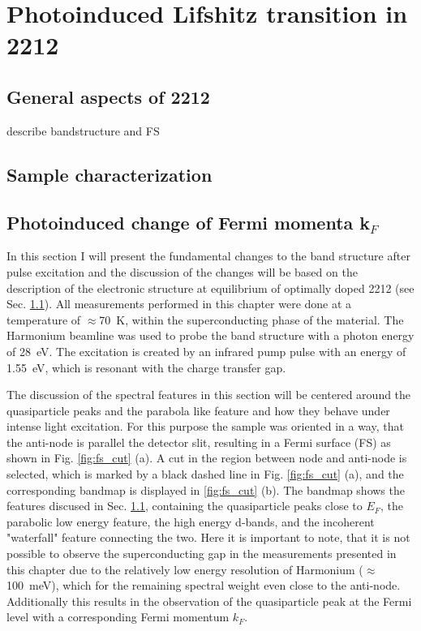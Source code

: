 \chapter{Photoinduced Lifshitz transition in 2212}



\section{General aspects of 2212}
\label{sec:bscco_general}


describe bandstructure and FS

\section{Sample characterization}



\section{Photoinduced change of Fermi momenta k$_F$}
\label{sec:larger_effect}

In this section I will present the fundamental changes to the band structure after pulse excitation and the discussion of the changes will be based on the description of the electronic structure at equilibrium of optimally doped 2212 (see Sec. \ref{sec:bscco_general}).
All measurements performed in this chapter were done at a temperature of $\approx$\qty{70}{\kelvin}, within the superconducting phase of the material.
The Harmonium beamline \cite{arrell_harmonium_2017} was used to probe the band structure with a photon energy of \qty{28}{\electronvolt}.
The excitation is created by an infrared pump pulse with an energy of \qty{1.55}{\electronvolt}, which is resonant with the charge transfer gap.

The discussion of the spectral features in this section will be centered around the quasiparticle peaks and the parabola like feature and how they behave under intense light excitation.
For this purpose the sample was oriented in a way, that the anti-node is parallel the detector slit, resulting in a Fermi surface (FS) as shown in Fig. \ref{fig:fs_cut} (a).
A cut in the region between node and anti-node is selected, which is marked by a black dashed line in Fig. \ref{fig:fs_cut} (a), and the corresponding bandmap is displayed in \ref{fig:fs_cut} (b).
The bandmap shows the features discused in Sec. \ref{sec:bscco_general}, containing the quasiparticle peaks close to $E_F$, the parabolic low energy feature, the high energy  d-bands, and the incoherent "waterfall" feature connecting the two.
Here it is important to note, that it is not possible to observe the superconducting gap in the measurements presented in this chapter due to the relatively low energy resolution of Harmonium ($\approx$\qty{100}{\milli\electronvolt}), which for the remaining spectral weight even close to the anti-node.
Additionally this results in the observation of the quasiparticle peak at the Fermi level with a corresponding Fermi momentum $k_F$.

